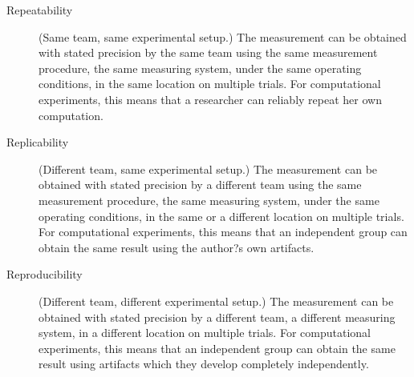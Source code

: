 \documentclass{statement}
\newlength{\up}
\begin{document}
\begin{description}
\item[Repeatability ]  (Same team, same experimental setup.)
The measurement can be obtained with stated precision by the same team using the same measurement procedure, the same measuring system, under the same operating conditions, in the same location on multiple trials. For computational experiments, this means that a researcher can reliably repeat her own computation.
\item[Replicability ] (Different team, same experimental setup.)
The measurement can be obtained with stated precision by a different team using the same measurement procedure, the same measuring system, under the same operating conditions, in the same or a different location on multiple trials. For computational experiments, this means that an independent group can obtain the same result using the author?s own artifacts.
\item[Reproducibility] (Different team, different experimental setup.)
The measurement can be obtained with stated precision by a different team, a different measuring system, in a different location on multiple trials. For computational experiments, this means that an independent group can obtain the same result using artifacts which they develop completely independently.
\end{description}


















\end{document}
